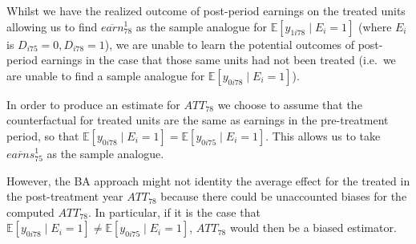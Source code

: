 \documentclass[
]{article}
\begin{document}
\begin{enumerate}
  Whilst we have the realized outcome of post-period earnings on the
  treated units allowing us to find \(\overline{earn}_{78}^{1}\) as the
  sample analogue for \(\mathbb{E}[y_{1i78} \mid E_i = 1]\) (where
  \(E_i\) is \(D_{i75} = 0, D_{i78} = 1\)), we are unable to learn the
  potential outcomes of post-period earnings in the case that those same
  units had not been treated (i.e.~we are unable to find a sample
  analogue for \(\mathbb{E}[y_{0i78} \mid E_i = 1]\)).

  In order to produce an estimate for \({ATT}_{78}\) we choose to assume
  that the counterfactual for treated units are the same as earnings in
  the pre-treatment period, so that
  \(\mathbb{E}[y_{0i78} \mid E_i = 1] = \mathbb{E}[y_{0i75} \mid E_i = 1]\).
  This allows us to take \(\overline{earns}_{75}^{1}\) as the sample
  analogue.

  However, the BA approach might not identity the average effect for the
  treated in the post-treatment year \(ATT_{78}\) because there could be
  unaccounted biases for the computed \(ATT_{78}\). In particular, if it
  is the case that
  \(\mathbb{E}[y_{0i78} \mid E_i = 1] \neq \mathbb{E}[y_{0i75} \mid E_i = 1]\),
  \(ATT_{78}\) would then be a biased estimator.
\end{enumerate}
\end{document}
